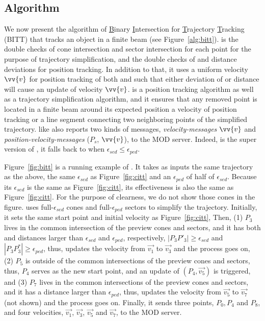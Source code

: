 \subsection{Algorithm}
We now present the algorithm of \underline{B}inary \underline{I}ntersection for \underline{T}rajectory \underline{T}racking (BITT) that tracks an object in a finite beam (see Figure~\ref{alg:bitt}). 
%
\bitt is the double checks of cone intersection and sector intersection for each point for the purpose of trajectory simplification, and the double checks of \sed and \ped distance deviations for position tracking. In addition to that, it uses a uniform velocity $\vv{v}$ for position tracking of both \sed and \ped such that either deviation of \ped or \sed distance will cause an update of velocity $\vv{v}$. 
%
\bitt is a position tracking algorithm as well as a trajectory simplification algorithm, and it ensures that any removed point is located in a finite beam around its expected position \wrt a velocity of position tracking or a line segment connecting two neighboring points of the simplified trajectory. 
%
\bitt like \citt also reports two kinds of messages, \ie \emph{velocity-messages} $\vv{v}$ and \emph{position-velocity-messages} ($P_s$, $\vv{v}$), to the MOD server. 
Indeed, \bitt is the super version of \citt, \ie it falls back to \citt when $\epsilon_{sed} \le \epsilon_{ped}$.

\begin{example}
	Figure~\ref{fig:bitt} is a running example of \bitt. It takes as inputs the same trajectory as the above, the same $\epsilon_{sed}$ as Figure~\ref{fig:citt} and an $\epsilon_{ped}$ of half of $\epsilon_{sed}$. Because its $\epsilon_{sed}$ is the same as Figure~\ref{fig:citt}, its effectiveness is also the same as Figure~\ref{fig:citt}. For the purpose of clearness, we do not show those cones in the figure.
	\bitt uses full-$\epsilon_{sed}$ cones and full-$\epsilon_{ped}$ sectors to simplify the trajectory. Initially, it sets the same start point and initial velocity as Figure~\ref{fig:citt}, 
	Then, (1) $P_3$ lives in the common intersection of the preview cones and sectors, and it has both \sed and \ped distances larger than $\epsilon_{sed}$ and $\epsilon_{ped}$, respectively, \ie $|P_3P'_3| \ge \epsilon_{sed}$ and $|P_3P^*_3| \ge \epsilon_{ped}$, thus, \bitt updates the velocity from $\vec{v_1}$ to $\vec{v_3}$ and the process goes on, (2) $P_5$ is outside of the common intersections of the preview cones and sectors, thus, $P_4$ serves as the new start point, and an update of $(P_4, \vec{v_5})$ is triggered, and (3) $P_7$ lives in the common intersections of the preview cones and sectors, and it has a \ped distance larger than $\epsilon_{ped}$, thus, \bitt updates the velocity from $\vec{v_5}$ to $\vec{v_7}$ (not shown) and the process goes on. Finally, it sends three points, $P_0, P_4$ and $P_8$, and four velocities, $\vec{v_1}$, $\vec{v_3}$, $\vec{v_5}$ and $\vec{v_7}$, to the MOD server. 
\end{example}

